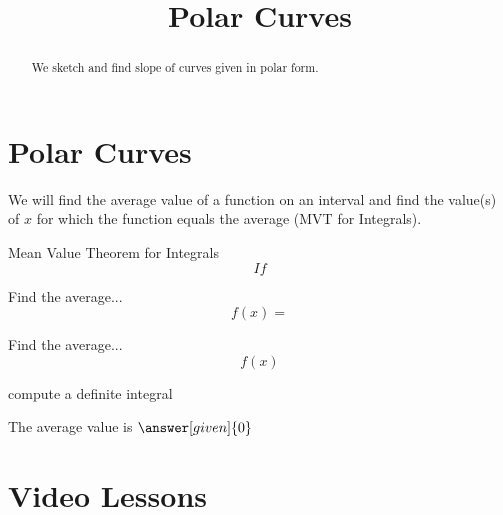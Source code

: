 \documentclass{ximera}
\title{Polar Curves}
\begin{document}
\begin{abstract}
We sketch and find slope of curves given in polar form.
\end{abstract}

\maketitle

\section{Polar Curves}

We will find the average value of a function on an interval 
and find the value(s) of $x$ for which the function equals the 
average (MVT for Integrals).

\begin{theorem} Mean Value Theorem for Integrals 
\[
If
\]
\end{theorem}






\begin{example} %
Find the average...
 \[
  f(x) = 
  \]
\end{example}

\begin{center}
\begin{foldable}
\end{foldable}
\end{center}


\begin{problem} %
  Find the average...
  \[
  f(x)
  \]
    \begin{hint}
      compute a definite integral
    \end{hint}
    
		
		The average value is
		 $\answer[given]{0}$
\end{problem}

\section{Video Lessons}


\begin{center}
\begin{foldable}
\end{foldable}
\end{center}
\end{document}
